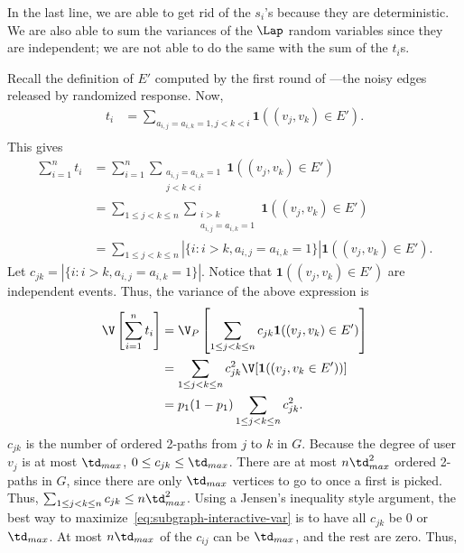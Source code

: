   In the last line, we are able to get rid of the $s_i$'s because they are
  deterministic. We are also able to sum the variances of the $\Lap$ random
  variables since they are independent; we are not able to do the same with the
  sum of the $t_i$s. 

  Recall the definition of $E'$ computed by the first round of
  ---the noisy edges released by randomized
  response. Now,
  \begin{align*}
    t_i &= \sum_{a_{i,j}=a_{i,k}=1, j<k<i} \textbf{1}((v_j,v_k) \in E'). \\
  \end{align*}
  This gives
  \begin{align*}
    \sum_{i=1}^n t_i &= \sum_{i=1}^n\sum_{\substack{a_{i,j}=a_{i,k}=1 \\ j<k<i }} \textbf{1}((v_j,v_k) \in
    E') \\
    &= \sum_{1 \leq j < k \leq n} \sum_{\substack{i > k \\ a_{i,j}=a_{i,k}=1
    }} \textbf{1}((v_j,v_k) \in E') \\
    &= \sum_{1 \leq j < k \leq n} |\{i : i>k, a_{i,j}=a_{i,k}=1\}| \textbf{1}((v_j,v_k)
    \in E').
  \end{align*}
  Let $c_{jk} = |\{i : i>k, a_{i,j}=a_{i,k}=1\}|$. Notice that $\textbf{1}( (v_j,v_k) \in E')$
  are independent events. Thus, the variance of the above expression is
  \begin{align}
    \V\left[\sum_{i=1}^n t_i\right] &= \V_P \left[\sum_{1 \leq j < k \leq n}
    c_{jk} \textbf{1}( (v_j,v_k) \in E') \right] \nonumber \\
    &= \sum_{1 \leq j < k \leq n} c_{jk}^2 \V[\textbf{1}( (v_j,v_k \in E')) ]
    \nonumber \\
    &= p_1 (1-p_1) \sum_{1 \leq j < k \leq n} c_{jk}^2.
    \label{eq:subgraph-interactive-var}
  \end{align}
  $c_{jk}$ is the number of ordered 2-paths from $j$ to $k$ in $G$. Because 
  the degree of user $v_j$ is at most $\td_{max}$, 
  $0 \leq c_{jk} \leq \td_{max}$. There are at most
  $n\td_{max}^2$ ordered
  2-paths in $G$, since there are only $\td_{max}$ vertices to go to once a first is
  picked. Thus, $\sum_{1 \leq j < k \leq n} c_{jk} \leq n\td_{max}^2$. Using a Jensen's inequality
  style argument, the best way to maximize~\eqref{eq:subgraph-interactive-var} is to have
  all $c_{jk}$ be $0$ or $\td_{max}$. At most $n\td_{max}$ of the $c_{ij}$
  can be $\td_{max}$, and the rest are zero. Thus,
